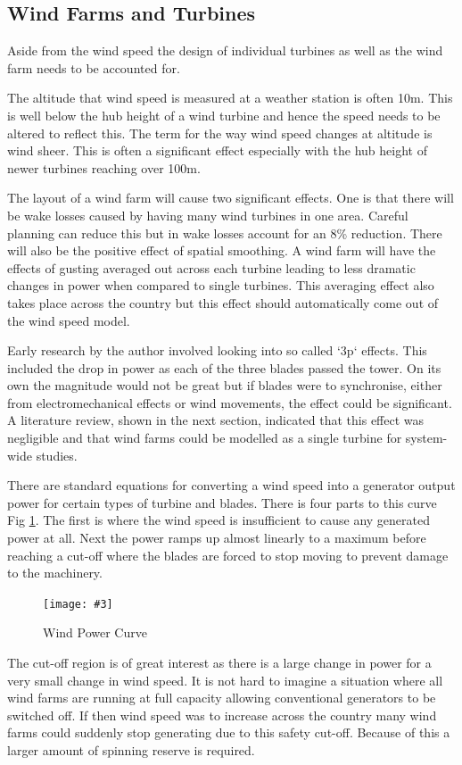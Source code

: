 \documentclass[a4paper,oneside,12pt]{report}
\newcommand{\image}[3] {
  \begin{figure}
    \begin{center}
      \texttt{[image: \#3]}
      \caption{#2}
      \label{#1}
    \end{center}
  \end{figure}
}
\begin{document}
\subsection{Wind Farms and Turbines}

Aside from the wind speed the design of individual turbines as well as the wind farm needs to be accounted for.

The altitude that wind speed is measured at a weather station is often 10m. This is well below the hub height of a wind turbine and hence the speed needs to be altered to reflect this. The term for the way wind speed changes at altitude is wind sheer. This is often a significant effect especially with the hub height of newer turbines reaching over 100m.

The layout of a wind farm will cause two significant effects. One is that there will be wake losses caused by having many wind turbines in one area. Careful planning can reduce this but in \cite{Pudaruth2009} wake losses account for an 8\% reduction. There will also be the positive effect of spatial smoothing. A wind farm will have the effects of gusting averaged out across each turbine leading to less dramatic changes in power when compared to single turbines. This averaging effect also takes place across the country but this effect should automatically come out of the wind speed model.

Early research by the author involved looking into so called `3p` effects. This included the drop in power as each of the three blades passed the tower. On its own the magnitude would not be great but if blades were to synchronise, either from electromechanical effects or wind movements, the effect could be significant. A literature review, shown in the next section, indicated that this effect was negligible and that wind farms could be modelled as a single turbine for system-wide studies.

There are standard equations \cite{Ackermann2005} for converting a wind speed into a generator output power for certain types of turbine and blades. There is four parts to this curve Fig \ref{WindPowerCurve}. The first is where the wind speed is insufficient to cause any generated power at all. Next the power ramps up almost linearly to a maximum before reaching a cut-off where the blades are forced to stop moving to prevent damage to the machinery.

\image{WindPowerCurve}{Wind Power Curve \cite{BWEA2005f}}{windpowercurve.png}

The cut-off region is of great interest as there is a large change in power for a very small change in wind speed. It is not hard to imagine a situation where all wind farms are running at full capacity allowing conventional generators to be switched off. If then wind speed was to increase across the country many wind farms could suddenly stop generating due to this safety cut-off. Because of this a larger amount of spinning reserve is required.
\end{document}
